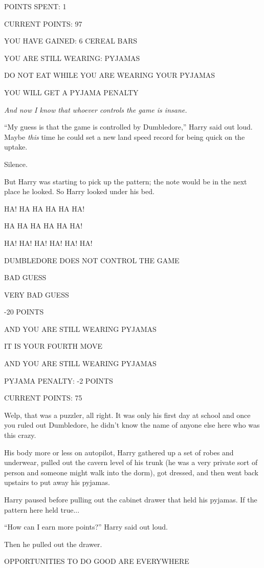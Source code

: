 POINTS SPENT: 1

CURRENT POINTS: 97

YOU HAVE GAINED: 6 CEREAL BARS

YOU ARE STILL WEARING: PYJAMAS

DO NOT EAT WHILE YOU ARE WEARING YOUR PYJAMAS

YOU WILL GET A PYJAMA PENALTY

\emph{And now I know that whoever controls the game is insane.}

``My guess is that the game is controlled by Dumbledore,'' Harry said out loud. Maybe \emph{this} time he could set a new land speed record for being quick on the uptake.

Silence.

But Harry was starting to pick up the pattern; the note would be in the next place he looked. So Harry looked under his bed.

HA! HA HA HA HA HA!

HA HA HA HA HA HA!

HA! HA! HA! HA! HA! HA!

DUMBLEDORE DOES NOT CONTROL THE GAME

BAD GUESS

VERY BAD GUESS

-20 POINTS

AND YOU ARE STILL WEARING PYJAMAS

IT IS YOUR FOURTH MOVE

AND YOU ARE STILL WEARING PYJAMAS

PYJAMA PENALTY: -2 POINTS

CURRENT POINTS: 75

Welp, that was a puzzler, all right. It was only his first day at school and once you ruled out Dumbledore, he didn't know the name of anyone else here who was this crazy.

His body more or less on autopilot, Harry gathered up a set of robes and underwear, pulled out the cavern level of his trunk (he was a very private sort of person and someone might walk into the dorm), got dressed, and then went back upstairs to put away his pyjamas.

Harry paused before pulling out the cabinet drawer that held his pyjamas. If the pattern here held true...

``How can I earn more points?'' Harry said out loud.

Then he pulled out the drawer.

OPPORTUNITIES TO DO GOOD ARE EVERYWHERE

